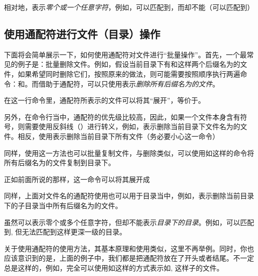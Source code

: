 相对地，表示\emph{零个或一个任意字符}，例如，可以匹配到，而却不能（可以匹配到）

\subsection{使用通配符进行文件（目录）操作}\label{subsec:通配符-使用通配符进行文件目录操作}

下面将会简单展示一下，如何使用通配符对文件进行“批量操作”。首先，一个最常见的例子是：批量删除文件。例如，假设当前目录下有和这样两个后缀名为的文件，如果希望同时删除它们，按照原来的做法，则可能需要按照顺序执行两遍命令：和。而借助于通配符，可以只使用表示\emph{删除所有后缀名为的文件}。

\begin{attention}
    在这一行命令里，通配符所表示的文件可以将其“展开”，等价于。

    另外，在命令行当中，通配符的优先级比较高，因此，如果一个文件本身含有符号\code{*}，则需要使用反斜线（\code{\textbackslash}）进行转义，例如，表示删除当前目录下文件名为\code{*}的文件。相反，使用表示删除当前目录下所有文件（务必要小心这一命令）
\end{attention}

同样，使用这一方法也可以批量复制文件，与删除类似，可以使用如这样的命令将所有后缀名为的文件复制到目录下。

正如前面所说的那样，这一命令可以将其展开成

同样，上面对文件名的通配符使用也可以用于目录当中，例如，表示删除当前目录下的子目录当中所有后缀名为的文件。

\begin{attention}
    \code{*}虽然可以表示零个或多个任意字符，但却不能表示\emph{目录下的目录}。例如，可以匹配到, 但无法匹配到这样更深一级的目录。
\end{attention}

关于使用通配符的使用方法，其基本原理和使用\code{*}类似，这里不再举例。同时，你也应该意识到的是，上面的例子中，我们都是把通配符放在了开头或者结尾。不一定总是这样的，例如，完全可以使用如这样的方式表示如, 这样子的文件。

